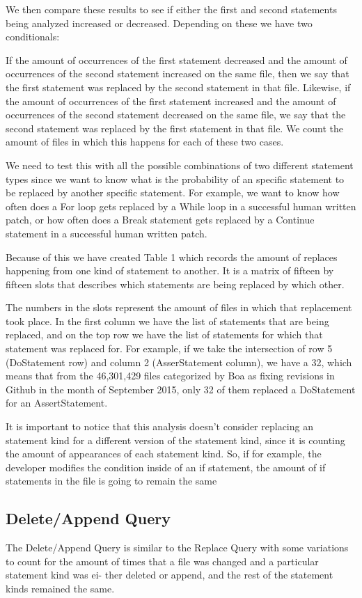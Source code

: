 \documentclass{sig-alternate-05-2015}
\begin{document}
We then compare these results to see if either the first and second statements
being analyzed increased or decreased. Depending on these we have two
conditionals:

If the amount of occurrences of the first statement decreased and the amount of
occurrences of the second statement increased on the same file, then we say that
the first statement was replaced by the second statement in that file. Likewise,
if the amount of occurrences of the first statement increased and the amount of
occurrences of the second statement decreased on the same file, we say that the
second statement was replaced by the first statement in that file. We count the
amount of files in which this happens for each of these two cases.

We need to test this with all the possible combinations of two different
statement types since we want to know what is the probability of an specific
statement to be replaced by another specific statement. For example, we want to
know how often does a For loop gets replaced by a While loop in a successful
human written patch, or how often does a Break statement gets replaced by a
Continue statement in a successful human written patch.

Because of this we have created Table 1 which records the amount of replaces happening from one kind of statement to another. It is a matrix of fifteen by fifteen slots that describes which statements are being replaced by which other. 

The numbers in the slots represent the amount of files in which that replacement took place. In the first column we have the list of statements that are being replaced, and on the top row we have the list of statements for which that statement was replaced for. For example, if we take the intersection of row 5 (DoStatement row) and column 2 (AsserStatement column), we have a 32, which means that from the 46,301,429 files categorized by Boa as fixing revisions in Github in the month of September 2015, only 32 of them replaced a DoStatement for an AssertStatement.

It is important to notice  that this analysis doesn't consider replacing an statement kind for a different version of the statement kind, since it is counting the amount of appearances of each statement kind. So, if for example, the developer modifies the condition inside of an if statement, the amount of if statements in the file is going to remain the same

\subsection{Delete/Append Query}
The Delete/Append Query is similar to the Replace Query with some variations to count for the amount of times that a file was changed and a particular statement kind was ei- ther deleted or append, and the rest of the statement kinds remained the same.
\end{document}
